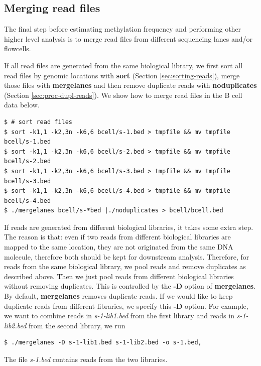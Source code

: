 \documentclass{article}
\begin{document}
\subsection{Merging read files}
\label{sec:merging-reads-files}
The final step before estimating methylation frequency and performing
other higher level analysis is to merge read files from different
sequencing lanes and/or flowcells. 

If all read files are generated from the same biological library, we
first sort all read files by genomic locations with \textbf{sort}
(Section \ref{sec:sorting-reads}), merge those files with
\textbf{mergelanes} and then remove duplicate reads with
\textbf{noduplicates} (Section \ref{sec:proc-dupl-reads}). We show how
to merge read files in the B cell data below.
\begin{verbatim}
$ # sort read files
$ sort -k1,1 -k2,3n -k6,6 bcell/s-1.bed > tmpfile && mv tmpfile bcell/s-1.bed
$ sort -k1,1 -k2,3n -k6,6 bcell/s-2.bed > tmpfile && mv tmpfile bcell/s-2.bed
$ sort -k1,1 -k2,3n -k6,6 bcell/s-3.bed > tmpfile && mv tmpfile bcell/s-3.bed
$ sort -k1,1 -k2,3n -k6,6 bcell/s-4.bed > tmpfile && mv tmpfile bcell/s-4.bed
$ ./mergelanes bcell/s-*bed |./noduplicates > bcell/bcell.bed 
\end{verbatim}

If reads are generated from different biological libraries, it takes
some extra step. The reason is that: even if two reads from different
biological libraries are mapped to the same location, they are not
originated from the same DNA molecule, therefore both should be kept
for downstream analysis. Therefore, for reads from the same biological
library, we pool reads and remove duplicates as described above. Then
we just pool reads from different biological libraries without
removing duplicates. This is controlled by the \textbf{-D} option of
\textbf{mergelanes}. By default, \textbf{mergelanes} removes duplicate
reads. If we would like to keep duplicate reads from different
libraries, we specify this \textbf{-D} option. For example, we want to
combine reads in \textit{s-1-lib1.bed} from the first library and
reads in \textit{s-1-lib2.bed} from the second library, we run
\begin{verbatim}
$ ./mergelanes -D s-1-lib1.bed s-1-lib2.bed -o s-1.bed,  
\end{verbatim}
The file \textit{s-1.bed} contains reads from the two libraries. 
\end{document}
